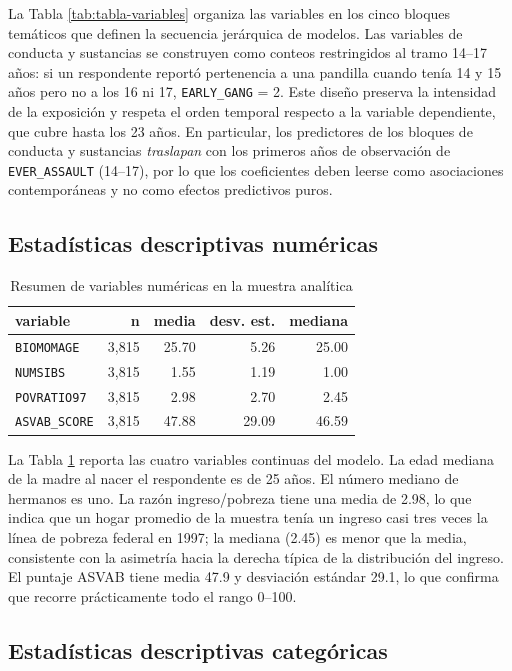\documentclass[11pt]{article}
\begin{document}
La Tabla \ref{tab:tabla-variables} organiza las variables en los cinco bloques temáticos que definen la secuencia jerárquica de modelos. Las variables de conducta y sustancias se construyen como conteos restringidos al tramo 14--17 años: si un respondente reportó pertenencia a una pandilla cuando tenía 14 y 15 años pero no a los 16 ni 17, \texttt{EARLY\_GANG} = 2. Este diseño preserva la intensidad de la exposición y respeta el orden temporal respecto a la variable dependiente, que cubre hasta los 23 años. En particular, los predictores de los bloques de conducta y sustancias \textit{traslapan} con los primeros años de observación de \texttt{EVER\_ASSAULT} (14--17), por lo que los coeficientes deben leerse como asociaciones contemporáneas y no como efectos predictivos puros.

\subsection{Estadísticas descriptivas numéricas}

\begin{table}[H]
\centering
\caption{Resumen de variables numéricas en la muestra analítica}
\label{tab:tabla-numericas}
\small
\begin{tabular}{lrrrr}
\toprule
variable & n & media & desv. est. & mediana \\
\midrule
\texttt{BIOMOMAGE} & 3,815 & 25.70 & 5.26 & 25.00 \\
\texttt{NUMSIBS} & 3,815 & 1.55 & 1.19 & 1.00 \\
\texttt{POVRATIO97} & 3,815 & 2.98 & 2.70 & 2.45 \\
\texttt{ASVAB\_SCORE} & 3,815 & 47.88 & 29.09 & 46.59 \\
\bottomrule
\end{tabular}
\end{table}

La Tabla \ref{tab:tabla-numericas} reporta las cuatro variables continuas del modelo. La edad mediana de la madre al nacer el respondente es de 25 años. El número mediano de hermanos es uno. La razón ingreso/pobreza tiene una media de 2.98, lo que indica que un hogar promedio de la muestra tenía un ingreso casi tres veces la línea de pobreza federal en 1997; la mediana (2.45) es menor que la media, consistente con la asimetría hacia la derecha típica de la distribución del ingreso. El puntaje ASVAB tiene media 47.9 y desviación estándar 29.1, lo que confirma que recorre prácticamente todo el rango 0--100.

\subsection{Estadísticas descriptivas categóricas}
\end{document}
